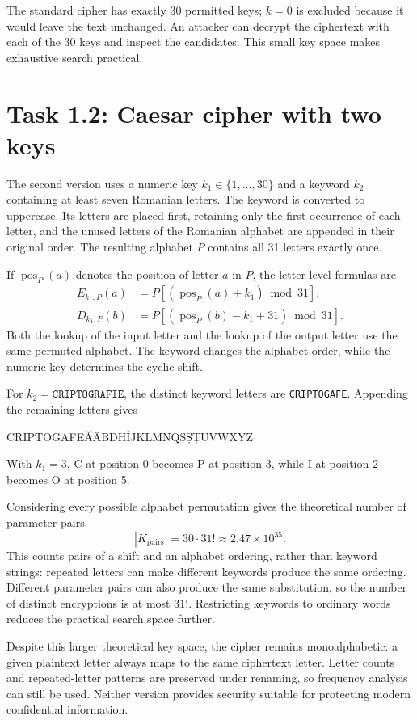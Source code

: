 \documentclass{tum_report}
\begin{document}
The standard cipher has exactly 30 permitted keys; $k=0$ is excluded because
it would leave the text unchanged. An attacker can decrypt the ciphertext
with each of the 30 keys and inspect the candidates. This small key space
makes exhaustive search practical.

\clearpage
\section{Task 1.2: Caesar cipher with two keys}
The second version uses a numeric key $k_1\in\{1,\ldots,30\}$ and a keyword
$k_2$ containing at least seven Romanian letters. The keyword is converted
to uppercase. Its letters are placed first, retaining only the first
occurrence of each letter, and the unused letters of the Romanian alphabet
are appended in their original order. The resulting alphabet $P$ contains
all 31 letters exactly once.

If $\operatorname{pos}_P(a)$ denotes the position of letter $a$ in $P$, the
letter-level formulas are
\begin{align}
 E_{k_1,P}(a)&=P[(\operatorname{pos}_P(a)+k_1)\bmod31],\\
 D_{k_1,P}(b)&=P[(\operatorname{pos}_P(b)-k_1+31)\bmod31].
\end{align}
Both the lookup of the input letter and the lookup of the output letter use
the same permuted alphabet. The keyword changes the alphabet order, while
the numeric key determines the cyclic shift.

For $k_2=\texttt{CRIPTOGRAFIE}$, the distinct keyword letters are
\texttt{CRIPTOGAFE}. Appending the remaining letters gives
\begin{center}\small\ttfamily
CRIPTOGAFEĂÂBDHÎJKLMNQSȘȚUVWXYZ
\end{center}
With $k_1=3$, C at position 0 becomes P at position 3, while I at position 2
becomes O at position 5.

Considering every possible alphabet permutation gives the theoretical
number of parameter pairs
\[
 |K_{\mathrm{pairs}}|=30\cdot31!\approx2.47\times10^{35}.
\]
This counts pairs of a shift and an alphabet ordering, rather than keyword
strings: repeated letters can make different keywords produce the same
ordering. Different parameter pairs can also produce the same substitution,
so the number of distinct encryptions is at most $31!$. Restricting keywords
to ordinary words reduces the practical search space further.

Despite this larger theoretical key space, the cipher remains
monoalphabetic: a given plaintext letter always maps to the same ciphertext
letter. Letter counts and repeated-letter patterns are preserved under
renaming, so frequency analysis can still be used. Neither version provides
security suitable for protecting modern confidential information.
\end{document}
